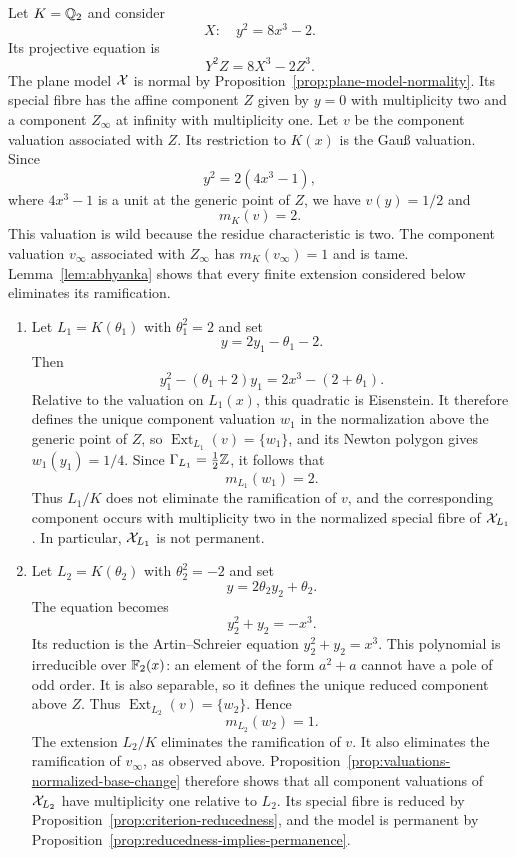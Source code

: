 \begin{example}\label{ex:wild-quadratic-extensions}
    Let $K=\mathbb Q_2$ and consider
    \[
        X:\quad y^2=8x^3-2.
    \]
    Its projective equation is
    \[
        Y^2Z=8X^3-2Z^3.
    \]
    The plane model $\mathcal X$ is normal by Proposition~\ref{prop:plane-model-normality}.
    Its special fibre has the affine component $Z$ given by $y=0$ with multiplicity two and a component $Z_\infty$ at infinity with multiplicity one.
    Let $v$ be the component valuation associated with $Z$.
    Its restriction to $K(x)$ is the Gauß valuation.
    Since
    \[
        y^2=2(4x^3-1),
    \]
    where $4x^3-1$ is a unit at the generic point of $Z$, we have $v(y)=1/2$ and
    \[
        m_K(v)=2.
    \]
    This valuation is wild because the residue characteristic is two.
    The component valuation $v_\infty$ associated with $Z_\infty$ has $m_K(v_\infty)=1$ and is tame.
    Lemma~\ref{lem:abhyanka} shows that every finite extension considered below eliminates its ramification.

    \begin{enumerate}[label=\textup{(\alph*)}]
        \item Let $L_1=K(\theta_1)$ with $\theta_1^2=2$ and set
        \[
            y=2y_1-\theta_1-2.
        \]
        Then
        \[
            y_1^2-(\theta_1+2)y_1=2x^3-(2+\theta_1).
        \]
        Relative to the valuation on $L_1(x)$, this quadratic is Eisenstein.
        It therefore defines the unique component valuation $w_1$ in the normalization above the generic point of $Z$, so $\operatorname{Ext}_{L_1}(v)=\{w_1\}$, and its Newton polygon gives $w_1(y_1)=1/4$.
        Since $\Gamma_{L_1}=\frac12\mathbb Z$, it follows that
        \[
            m_{L_1}(w_1)=2.
        \]
        Thus $L_1/K$ does not eliminate the ramification of $v$, and the corresponding component occurs with multiplicity two in the normalized special fibre of $\mathcal X_{L_1}$.
        In particular, $\mathcal X_{L_1}$ is not permanent.

        \item Let $L_2=K(\theta_2)$ with $\theta_2^2=-2$ and set
        \[
            y=2\theta_2y_2+\theta_2.
        \]
        The equation becomes
        \[
            y_2^2+y_2=-x^3.
        \]
        Its reduction is the Artin--Schreier equation $y_2^2+y_2=x^3$.
        This polynomial is irreducible over $\mathbb F_2(x)$: an element of the form $a^2+a$ cannot have a pole of odd order.
        It is also separable, so it defines the unique reduced component above $Z$.
        Thus $\operatorname{Ext}_{L_2}(v)=\{w_2\}$.
        Hence
        \[
            m_{L_2}(w_2)=1.
        \]
        The extension $L_2/K$ eliminates the ramification of $v$.
        It also eliminates the ramification of $v_\infty$, as observed above.
        Proposition~\ref{prop:valuations-normalized-base-change} therefore shows that all component valuations of $\mathcal X_{L_2}$ have multiplicity one relative to $L_2$.
        Its special fibre is reduced by Proposition~\ref{prop:criterion-reducedness}, and the model is permanent by Proposition~\ref{prop:reducedness-implies-permanence}.
    \end{enumerate}


\end{example}
